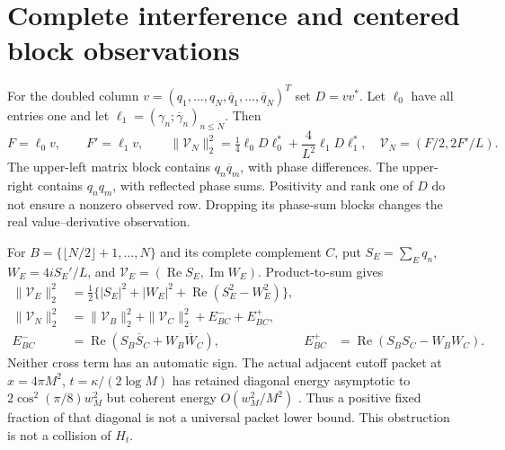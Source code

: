 \documentclass[11pt]{article}
\numberwithin{equation}{section}
\theoremstyle{definition}
\theoremstyle{remark}
\DeclareMathOperator{\Rea}{Re}
\DeclareMathOperator{\Ima}{Im}
\begin{document}
\section{Complete interference and centered block observations}
\label{sec:coherence}
For the doubled column $v=(q_1,\ldots,q_N,\overline q_1,\ldots,
\overline q_N)^T$ set $D=vv^*$. Let $\ell_0$ have all entries one
and let $\ell_1=(\gamma_n;\overline\gamma_n)_{n\le N}$. Then
\begin{equation}
 F=\ell_0v,\qquad F'=\ell_1v,\qquad
 \|\mathcal V_N\|_2^2=\tfrac14\ell_0D\ell_0^*
                         +\frac4{L^2}\ell_1D\ell_1^*,
 \quad\mathcal V_N=(F/2,2F'/L).
 \label{eq:density-observation}
\end{equation}
The upper-left matrix block contains $q_n\overline q_m$, with
phase differences. The upper-right contains $q_nq_m$, with reflected
phase sums. Positivity and rank one of $D$ do not ensure a nonzero
observed row. Dropping its phase-sum blocks changes the real
value--derivative observation.

For $B=\{\lfloor N/2\rfloor+1,\ldots,N\}$ and its complete
complement $C$, put $S_E=\sum_Eq_n$, $W_E=4iS_E'/L$,
and $\mathcal V_E=(\Rea S_E,\Ima W_E)$. Product-to-sum gives
\begin{align}
 \|\mathcal V_E\|_2^2
 &=\tfrac12\{|S_E|^2+|W_E|^2+\Rea(S_E^2-W_E^2)\},\nonumber\\
 \|\mathcal V_N\|_2^2
 &=\|\mathcal V_B\|_2^2+\|\mathcal V_C\|_2^2
     +E_{BC}^-+E_{BC}^+,\label{eq:recombination}\\
 E_{BC}^-&=\Rea(S_B\overline S_C+W_B\overline W_C),&
 E_{BC}^+&=\Rea(S_BS_C-W_BW_C).\nonumber
\end{align}
Neither cross term has an automatic sign. The actual adjacent cutoff
packet at $x=4\pi M^2$, $t=\kappa/(2\log M)$ has retained diagonal
energy asymptotic to $2\cos^2(\pi/8)w_M^2$ but coherent energy
$O(w_M^2/M^2)$ \cite{heatinterface,micro1}. Thus a positive fixed
fraction of that diagonal is not a universal packet lower bound.
This obstruction is not a collision of $H_t$.
\end{document}
